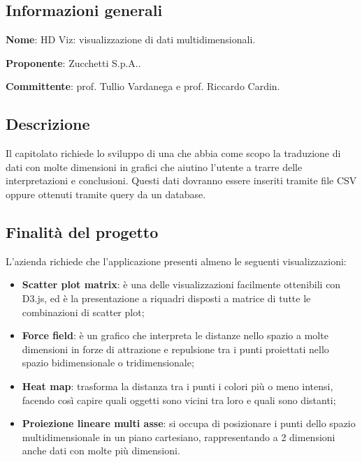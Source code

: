 \documentclass[../studio-di-fattibilita.tex]{subfiles}
\begin{document}
\subsection{Informazioni generali}%
\label{sub:c4_informazioni_generale}
\begin{description}
  \item \textbf{Nome}: HD Viz: visualizzazione di dati multidimensionali.
  \item \textbf{Proponente}: Zucchetti S.p.A..
  \item \textbf{Committente}: prof. Tullio Vardanega e prof. Riccardo Cardin.
\end{description}

\subsection{Descrizione}%
\label{sub:c4_descrizione}
Il capitolato richiede lo sviluppo di una  che abbia come scopo la 
traduzione di dati con molte dimensioni in grafici che aiutino l’utente a trarre delle interpretazioni e conclusioni. Questi dati dovranno essere inseriti tramite file CSV oppure ottenuti tramite query da un database.

\subsection{Finalità del progetto}%
\label{sub:c4_finalita_del_progetto}
L’azienda richiede che l’applicazione presenti almeno le seguenti visualizzazioni:
\begin{itemize}
  \item \textbf{Scatter plot matrix}: è una delle visualizzazioni facilmente ottenibili con D3.js, ed è la presentazione a riquadri disposti a matrice di tutte le combinazioni di scatter plot;
  \item \textbf{Force field}: è un grafico che interpreta le distanze nello spazio a molte dimensioni in forze di attrazione e repulsione tra i punti proiettati nello spazio bidimensionale o tridimensionale;
  \item \textbf{Heat map}: trasforma la distanza tra i punti i colori più o meno intensi, facendo così capire quali oggetti sono vicini tra loro e quali sono distanti;
  \item \textbf{Proiezione lineare multi asse}: si occupa di posizionare i punti dello spazio multidimensionale in un piano cartesiano, rappresentando a 2 dimensioni anche dati con molte più dimensioni. 
\end{itemize}
\end{document}
